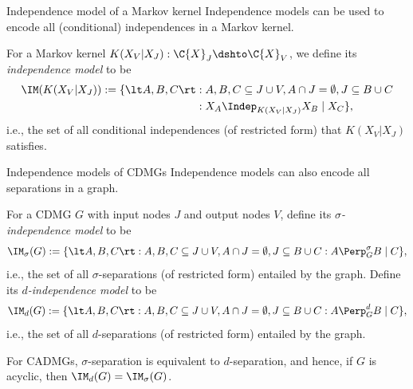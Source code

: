 \begin{frame}{Independence model of a Markov kernel}
Independence models can be used to encode all (conditional) independences in a Markov kernel.
\begin{Def}[\ref{def:independence_model_Markov_kernel}]
  For a Markov kernel $K(X_V|X_J) : \C{X}_J \dshto \C{X}_V$, we define its \emph{independence model} to be
  \begin{equation*}\begin{split}
    \IM(K(X_V | X_J)) := \{ \lt A, B, C \rt & : A, B, C \subseteq J \cup V, A \cap J = \emptyset, J \subseteq B \cup C \\
                                            & : X_A \Indep_{K(X_V | X_J)} X_B \mid X_C \},
  \end{split}\end{equation*}
  i.e., the set of all conditional independences (of restricted form) that $K(X_V|X_J)$ satisfies.
\end{Def}
\end{frame}

\begin{frame}{Independence models of CDMGs}
Independence models can also encode all separations in a graph.
\begin{Def}[\ref{def:independence_model_graph}]
  For a CDMG $G$ with input nodes $J$ and output nodes $V$, define its \emph{$\sigma$-independence model} to be
  $$\IM_\sigma(G) := \{ \lt A, B, C \rt : A, B, C \subseteq J \cup V, A \cap J = \emptyset, J \subseteq B \cup C : A \Perp_G^\sigma B \mid C \},$$
  i.e., the set of all $\sigma$-separations (of restricted form) entailed by the graph. 
  Define its \emph{$d$-independence model} to be
  $$\IM_d(G) := \{ \lt A, B, C \rt : A, B, C \subseteq J \cup V, A \cap J = \emptyset, J \subseteq B \cup C : A \Perp_G^d B \mid C \},$$
  i.e., the set of all $d$-separations (of restricted form) entailed by the graph.
\end{Def}
For CADMGs, $\sigma$-separation is equivalent to $d$-separation, and hence, if $G$ is acyclic, then $\IM_d(G) = \IM_\sigma(G)$.
\end{frame}

